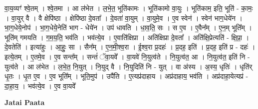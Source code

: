 \documentclass[17pt]{extarticle}
\begin{document}
वा॒य॒व्यꣳ॑ श्वे॒तम् । श्वे॒तमा । आ ल॑भेत । ल॒भे॒त॒ भूति॑कामः । भूति॑कामो वा॒युः । भूति॑काम॒ इति॒ भूति॑ - का॒मः॒ । वा॒युर् वै । वै क्षेपि॑ष्ठा । क्षेपि॑ष्ठा दे॒वता᳚ । दे॒वता॑ वा॒युम् । वा॒युमे॒व । ए॒व स्वेन॑ । स्वेन॑ भाग॒धेये॑न । भा॒ग॒धेये॒नोप॑ । भा॒ग॒धेये॒नेति॑ भाग - धेये॑न । उप॑ धावति । धा॒व॒ति॒ सः । स ए॒व । ए॒वैन᳚म् । ए॒न॒म् भूति᳚म् । भूति॑म् गमयति । ग॒म॒य॒ति॒ भव॑ति । भव॑त्ये॒व । ए॒वाति॑क्षिप्रा । अति॑क्षिप्रा दे॒वता᳚ । अति॑क्षि॒प्रेत्यति॑ - क्षि॒प्रा॒ । दे॒वतेति॑ । इत्या॑हुः । आ॒हुः॒ सा । सैन᳚म् । ए॒न॒मी॒श्व॒रा । ई॒श्व॒रा प्र॒दहः॑ । प्र॒दह॒ इति॑ । प्र॒दह॒ इति॑ प्र - दहः॑ । इत्ये॒तम् । ए॒तमे॒व । ए॒व सन्त᳚म् । सन्तं॑ ॅवा॒यवे᳚ । वा॒यवे॑ नि॒युत्व॑ते । नि॒युत्व॑त॒ आ । नि॒युत्व॑त॒ इति॑ नि - युत्व॑ते । आ ल॑भेत । ल॒भे॒त॒ नि॒युत् । नि॒युद् वै । नि॒युदिति॑ नि - युत् । वा अ॑स्य । अ॒स्य॒ धृतिः॑ । धृति॑र् धृ॒तः । धृ॒त ए॒व । ए॒व भूति᳚म् । भूति॒मुप॑ । उपै॑ति । ए॒त्यप्र॑दाहाय । अप्र॑दाहाय॒ भव॑ति । अप्र॑दाहा॒येत्यप्र॑ - दा॒हा॒य॒ । भव॑त्ये॒व । ए॒व वा॒यवे᳚ \newline

\textbf{Jatai Paata} \newline
\end{document}
